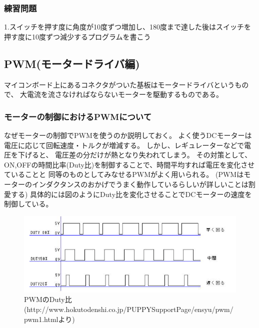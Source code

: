 \documentclass[uplatex]{jsarticle}
\begin{document}
\subsubsection{練習問題}
1.スイッチを押す度に角度が10度ずつ増加し、180度まで達した後はスイッチを押す度に10度ずつ減少するプログラムを書こう
\clearpage
\subsection{PWM(モータードライバ編)}
マイコンボード上にあるコネクタがついた基板はモータードライバというもので、
大電流を流さなければならないモーターを駆動するものである。
\subsubsection{モーターの制御におけるPWMについて}
なぜモーターの制御でPWMを使うのか説明しておく。
よく使うDCモーターは電圧に応じて回転速度・トルクが増減する。
しかし、レギュレーターなどで電圧を下げると、
電圧差の分だけが熱となり失われてしまう。
その対策として、ON,OFFの時間比率(Duty比)を制御することで、時間平均すれば電圧を変化させていることと
同等のものとしてみなせるPWMがよく用いられる。
(PWMはモーターのインダクタンスのおかげでうまく動作しているらしいが詳しいことは割愛する)
具体的には図のようにDuty比を変化させることでDCモーターの速度を制御している。
\begin{figure}[htbp]
    \centering
    \includegraphics[width=15cm]{pwm.jpg}
    \caption{PWMのDuty比(http://www.hokutodenshi.co.jp/PUPPYSupportPage/ensyu/pwm/pwm1.htmlより)}
\end{figure}
\end{document}
